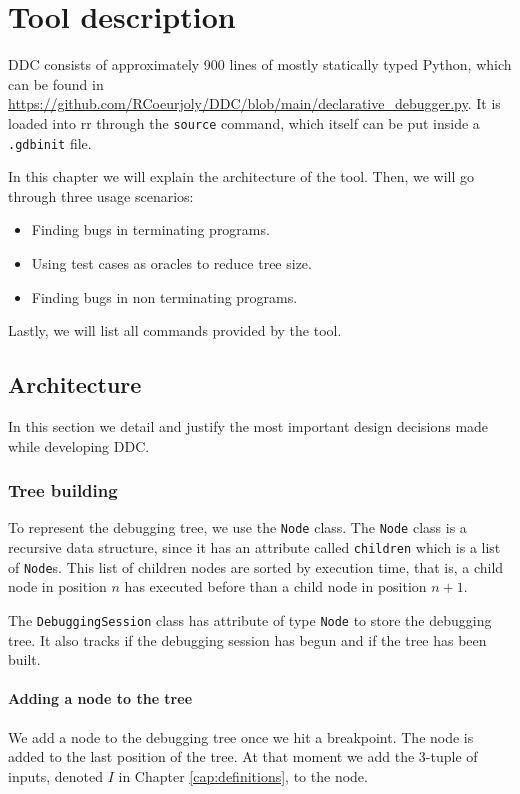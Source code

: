 \chapter{Tool description}
\label{cap:toolDescription}
DDC consists of approximately 900 lines of mostly statically typed Python, which can be found in \url{https://github.com/RCoeurjoly/DDC/blob/main/declarative_debugger.py}.
%
It is loaded into rr through the \verb|source| command, which itself can be put inside a \verb|.gdbinit| file.
%

In this chapter we will explain the architecture of the tool.
Then, we will go through three usage scenarios:
\begin{itemize}
    \item Finding bugs in terminating programs.
    \item Using test cases as oracles to reduce tree size.
    \item Finding bugs in non terminating programs.
\end{itemize}
Lastly, we will list all commands provided by the tool.

\section{Architecture}
In this section we detail and justify the most important design decisions made while developing DDC.
\subsection{Tree building}
To represent the debugging tree, we use the \verb|Node| class. The \verb|Node| class is a recursive data structure, since it has an attribute called \verb|children| which is a list of \verb|Node|s. This list of children nodes are sorted by execution time, that is, a child node in position \(n\) has executed before than a child node in position \(n+1\).

The \verb|DebuggingSession| class has attribute of type \verb|Node| to store the debugging tree. It also tracks if the debugging session has begun and if the tree has been built.

\subsubsection{Adding a node to the tree}
We add a node to the debugging tree once we hit a breakpoint.
The node is added to the last position of the tree.
At that moment we add the 3-tuple of inputs, denoted \(I\) in Chapter \ref{cap:definitions}, to the node.
